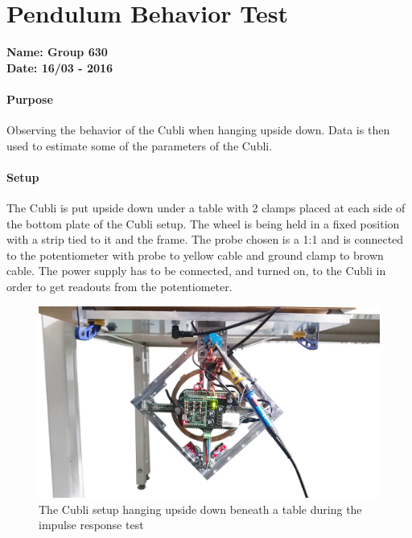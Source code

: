 \chapter{Pendulum Behavior Test}\label{app:impulseResponseAppendix} 

\textbf{Name: Group 630}\\
\textbf{Date: 16/03 - 2016}

\subsubsection{Purpose}
Observing the behavior of the Cubli when hanging upside down. Data is then used to estimate some of the parameters of the Cubli.

\subsubsection{Setup}
The Cubli is put upside down under a table with 2 clamps placed at each side of the bottom plate of the Cubli setup.
The wheel is being held in a fixed position with a strip tied to it and the frame. The probe chosen is a 1:1 and is connected to the potentiometer with probe to yellow cable and ground clamp to brown cable. The power supply has to be connected, and turned on, to the Cubli in order to get readouts from the potentiometer.
\begin{figure}[H] 
	\centering 
	\includegraphics[scale=0.2]{figures/impulseResponseSetup2}
	\caption{The Cubli setup hanging upside down beneath a table during the impulse response test}
	\label{impulseResponseTestPicture}
\end{figure} 

